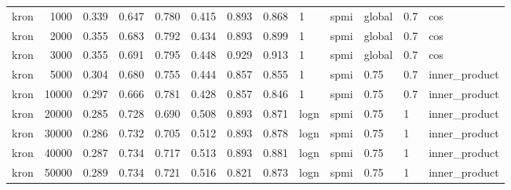 \begin{tabular}{lrrrrrrrlllll}
    kron &            1000 &      0.339 &  0.647 &  0.780 &  0.415 &      0.893 &      0.868 &     1 &   spmi &  global &  0.7 &            cos \\
    kron &            2000 &      0.355 &  0.683 &  0.792 &  0.434 &      0.893 &      0.899 &     1 &   spmi &  global &  0.7 &            cos \\
    kron &            3000 &      0.355 &  0.691 &  0.795 &  0.448 &      0.929 &      0.913 &     1 &   spmi &  global &  0.7 &            cos \\
    kron &            5000 &      0.304 &  0.680 &  0.755 &  0.444 &      0.857 &      0.855 &     1 &   spmi &    0.75 &  0.7 &  inner\_product \\
    kron &           10000 &      0.297 &  0.666 &  0.781 &  0.428 &      0.857 &      0.846 &     1 &   spmi &    0.75 &  0.7 &  inner\_product \\
    kron &           20000 &      0.285 &  0.728 &  0.690 &  0.508 &      0.893 &      0.871 &  logn &   spmi &    0.75 &    1 &  inner\_product \\
    kron &           30000 &      0.286 &  0.732 &  0.705 &  0.512 &      0.893 &      0.878 &  logn &   spmi &    0.75 &    1 &  inner\_product \\
    kron &           40000 &      0.287 &  0.734 &  0.717 &  0.513 &      0.893 &      0.881 &  logn &   spmi &    0.75 &    1 &  inner\_product \\
    kron &           50000 &      0.289 &  0.734 &  0.721 &  0.516 &      0.821 &      0.873 &  logn &   spmi &    0.75 &    1 &  inner\_product \\
\bottomrule
\end{tabular}
